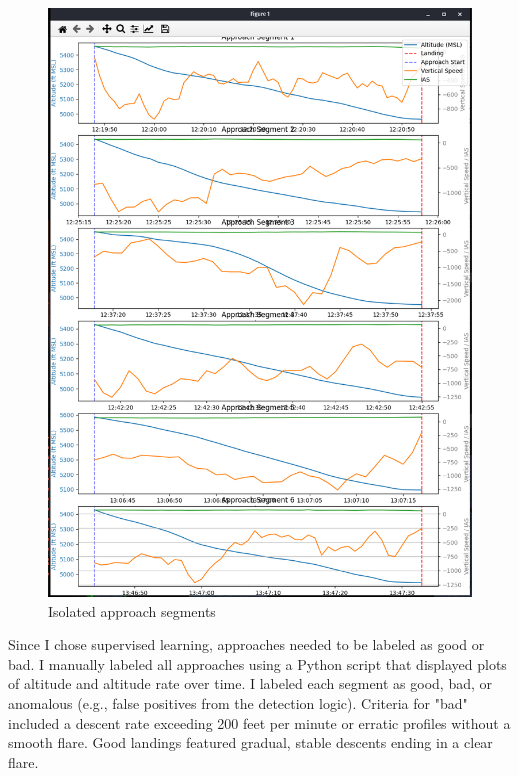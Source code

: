 \documentclass[conference]{IEEEtran}
\begin{document}
\begin{figure}[H]
    \centerline{\includegraphics[width=\linewidth]{figs/approach_segments.png}}
    \caption{Isolated approach segments}
\end{figure}

Since I chose supervised learning, approaches needed to be labeled as good or bad. I manually labeled all approaches using a Python script that displayed plots of altitude and altitude rate over time. I labeled each segment as good, bad, or anomalous (e.g., false positives from the detection logic). Criteria for "bad" included a descent rate exceeding 200 feet per minute or erratic profiles without a smooth flare. Good landings featured gradual, stable descents ending in a clear flare.
\end{document}
